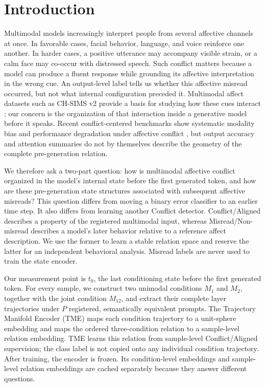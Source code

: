 \section{Introduction}

Multimodal models increasingly interpret people from several affective channels at
once. In favorable cases, facial behavior, language, and voice reinforce one another.
In harder cases, a positive utterance may accompany visible strain, or a calm face may
co-occur with distressed speech. Such conflict matters because a model can produce a
fluent response while grounding its affective interpretation in the wrong cue. An
output-level label tells us whether this affective misread occurred, but not what
internal configuration preceded it. Multimodal affect datasets such as CH-SIMS v2
provide a basis for studying how these cues interact \cite{liu2022chsims}; our concern
is the organization of that interaction inside a generative model before it speaks.
Recent conflict-centered benchmarks show systematic modality bias and performance
degradation under affective conflict \cite{han2025benchmarking,sun2026emomm}, but
output accuracy and attention summaries do not by themselves describe the geometry
of the complete pre-generation relation.

We therefore ask a two-part question: how is multimodal affective conflict organized
in the model's internal state before the first generated token, and how are these
pre-generation state structures associated with subsequent affective misreads? This
question differs from moving a binary error classifier to an earlier time step. It
also differs from learning another Conflict detector. Conflict/Aligned describes a
property of the registered multimodal input, whereas Misread/Non-misread describes a
model's later behavior relative to a reference affect description. We use the former
to learn a stable relation space and reserve the latter for an independent behavioral
analysis. Misread labels are never used to train the state encoder.

Our measurement point is \(t_0\), the last conditioning state before the first
generated token. For every sample, we construct two unimodal conditions \(M_1\) and
\(M_2\), together with the joint condition \(M_{12}\), and extract their complete
layer trajectories under \(P\) registered, semantically equivalent prompts. The
Trajectory Manifold Encoder (TME) maps each condition trajectory to a unit-sphere
embedding and maps the ordered three-condition relation to a sample-level relation
embedding. TME learns this relation from sample-level Conflict/Aligned supervision;
the class label is not copied onto any individual condition trajectory. After
training, the encoder is frozen. Its condition-level embeddings and sample-level
relation embeddings are cached separately because they answer different questions.

